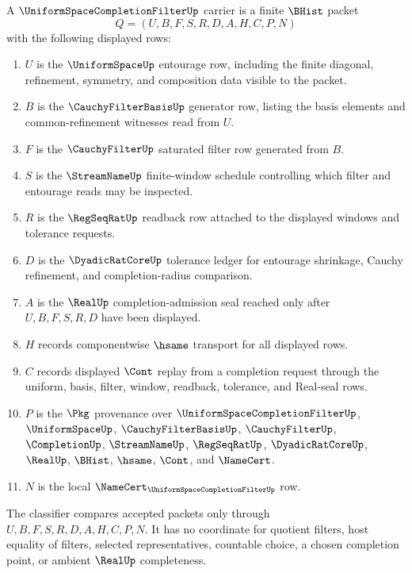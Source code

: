 \begin{definition}
\label{def:uniform-space-completion-filter-carrier}
A $\UniformSpaceCompletionFilterUp$ carrier is a finite $\BHist$ packet
$$
Q=(U,B,F,S,R,D,A,H,C,P,N)
$$
with the following displayed rows:
\begin{enumerate}
\item $U$ is the $\UniformSpaceUp$ entourage row, including the finite diagonal, refinement, symmetry, and composition data visible to the packet.
\item $B$ is the $\CauchyFilterBasisUp$ generator row, listing the basis elements and common-refinement witnesses read from $U$.
\item $F$ is the $\CauchyFilterUp$ saturated filter row generated from $B$.
\item $S$ is the $\StreamNameUp$ finite-window schedule controlling which filter and entourage reads may be inspected.
\item $R$ is the $\RegSeqRatUp$ readback row attached to the displayed windows and tolerance requests.
\item $D$ is the $\DyadicRatCoreUp$ tolerance ledger for entourage shrinkage, Cauchy refinement, and completion-radius comparison.
\item $A$ is the $\RealUp$ completion-admission seal reached only after $U,B,F,S,R,D$ have been displayed.
\item $H$ records componentwise $\hsame$ transport for all displayed rows.
\item $C$ records displayed $\Cont$ replay from a completion request through the uniform, basis, filter, window, readback, tolerance, and Real-seal rows.
\item $P$ is the $\Pkg$ provenance over $\UniformSpaceCompletionFilterUp$, $\UniformSpaceUp$, $\CauchyFilterBasisUp$, $\CauchyFilterUp$, $\CompletionUp$, $\StreamNameUp$, $\RegSeqRatUp$, $\DyadicRatCoreUp$, $\RealUp$, $\BHist$, $\hsame$, $\Cont$, and $\NameCert$.
\item $N$ is the local $\NameCert_{\UniformSpaceCompletionFilterUp}$ row.
\end{enumerate}
The classifier compares accepted packets only through $U,B,F,S,R,D,A,H,C,P,N$. It has no coordinate for quotient filters, host equality of filters, selected representatives, countable choice, a chosen completion point, or ambient $\RealUp$ completeness.
\end{definition}

